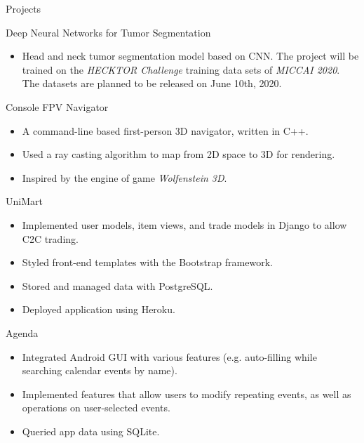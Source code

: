 \documentclass{article}
\newlength{\tabin}
\newlength{\secsep}
\newcommand{\lineunder}{\vspace*{-8pt} \\ \hspace*{-6pt} \hrulefill \\ \vspace*{-15pt}}
\newenvironment{tabbedsection}[1]{
  \begin{list}{}{
      \setlength{\itemsep}{0pt}
      \setlength{\labelsep}{0pt}
      \setlength{\labelwidth}{0pt}
      \setlength{\leftmargin}{\tabin}
      \setlength{\rightmargin}{\tabin}
      \setlength{\listparindent}{0pt}
      \setlength{\parsep}{0pt}
      \setlength{\parskip}{0pt}
      \setlength{\partopsep}{0pt}
      \setlength{\topsep}{#1}
    }
  \item[]
}{\end{list}}
\newenvironment{resume_section}[1]{
  \filbreak
  \vspace{2\secsep}
  \textsc{\large#1}
  \lineunder
  \begin{tabbedsection}{\secsep}
}{\end{tabbedsection}}
\newenvironment{resume_subsection}[2][]{
  \textbf{#2} \hfill {\footnotesize #1} \hspace{2em}
  \begin{tabbedsection}{0.5\secsep}
}{\end{tabbedsection}}
\newenvironment{subitems}{
  \renewcommand{\labelitemi}{-}
  \begin{itemize}
      \setlength{\labelsep}{1em}
}{\end{itemize}}
\begin{document}
\begin{resume_section}{Projects}

 \begin{resume_subsection}{Deep Neural Networks for Tumor Segmentation}
    \begin{subitems}
      \item Head and neck tumor segmentation model based on CNN. The project will be trained on 
      the \textit{HECKTOR Challenge} training data sets of \textit{MICCAI 2020}. The datasets are planned to be released on June 10th, 2020. 
    \end{subitems}
  \end{resume_subsection}

 \begin{resume_subsection}[(June 2020)]{Console FPV Navigator}
    \begin{subitems}
    \item A command-line based first-person 3D navigator, written in C++.
    \item Used a ray casting algorithm to map from 2D space to 3D for rendering.
    \item Inspired by the engine of game \textit{Wolfenstein 3D}.
    \end{subitems}
  \end{resume_subsection}

   \begin{resume_subsection}{UniMart}
    \begin{subitems}
    \item Implemented user models, item views, and trade models in Django to allow C2C trading.
    \item Styled front-end templates with the Bootstrap framework.
    \item Stored and managed data with PostgreSQL.
    \item Deployed application using Heroku.
    \end{subitems}
  \end{resume_subsection}

  \begin{resume_subsection}[(April 2020)]{Agenda}
    \begin{subitems}
      \item Integrated Android GUI with various features (e.g.
      auto-filling while searching calendar events by name).
      \item Implemented features that allow users to modify
      repeating events, as well as operations on user-selected events.
      \item Queried app data using SQLite.
    \end{subitems}
  \end{resume_subsection}


\end{resume_section}
\end{document}
